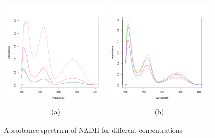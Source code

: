 \documentclass[a4paper,11pt]{article}
\begin{document}
        \begin{figure}[H]
            \centering
            \begin{tabular}{cc}
                \includegraphics[width=200px]{../resources/absorption_r1_spectrum.png} &
                \includegraphics[width=200px]{../resources/absorption_r2_spectrum.png} \\
                (a) & (b)\\
            \end{tabular}
            \caption{Absorbance spectrum of NADH for different concentrations}
            \label{fig:abs_spectrum}
        \end{figure}
\end{document}
